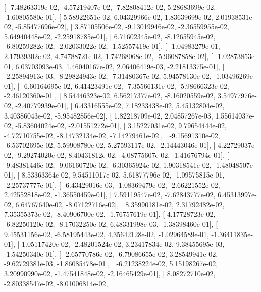 \documentclass{article}
\begin{document}
       [ -7.48263319e-02,  -4.57219407e-02,  -7.82808412e-02,
          5.28683699e-02,  -1.60805580e-01],
       [  5.58922651e-02,   6.04329966e-02,   1.83639699e-02,
          2.01938531e-02,  -5.85477696e-02],
       [  3.87105506e-02,  -9.13019946e-02,  -2.36559955e-02,
          5.64940448e-02,  -2.25918785e-01],
       [  6.71602345e-02,  -8.12655945e-02,  -6.80259282e-02,
         -2.02033022e-02,  -1.52557419e-01],
       [ -1.04983279e-01,   2.17939302e-02,   4.74788721e-02,
          1.74268068e-02,  -5.96087858e-02],
       [ -1.02873853e-01,   6.03703093e-03,   1.46040167e-02,
          2.06406419e-03,  -2.21813375e-01],
       [ -2.25894913e-03,  -8.29824943e-02,  -7.31480367e-02,
          5.94578130e-02,  -1.03496269e-01],
       [ -6.60164695e-02,   6.41423491e-02,  -7.35566131e-02,
         -5.98666323e-02,  -2.46120360e-01],
       [  8.54446323e-02,   6.56217377e-02,  -8.16020559e-02,
          3.54977976e-02,  -2.40779939e-01],
       [  6.43316555e-02,   7.18233438e-02,   5.45132804e-02,
          3.40386043e-02,  -5.95482856e-02],
       [  1.82218709e-02,   2.04857267e-03,   1.55614037e-02,
         -5.83604024e-02,  -2.01551272e-01],
       [  3.15227031e-02,   9.79654444e-02,  -4.72710755e-02,
         -8.14732134e-02,  -7.14279461e-02],
       [ -9.15691310e-02,  -6.53702695e-02,   5.59908780e-02,
          5.27593117e-02,  -2.14443046e-01],
       [  4.22729037e-02,  -9.29274020e-02,   8.40431812e-02,
         -4.08775607e-02,  -1.41676794e-01],
       [ -9.48381446e-02,  -9.06160720e-02,  -6.30365924e-02,
          1.90318541e-02,  -1.48048507e-01],
       [  8.53363364e-02,   9.54511017e-02,   5.61877796e-02,
         -1.09575815e-01,  -2.25737777e-01],
       [ -6.43429016e-03,  -1.08369479e-02,  -2.66221552e-02,
          2.42552818e-02,  -1.36550459e-01],
       [  7.59119547e-02,  -7.62843777e-02,   6.45313997e-02,
          6.64767640e-02,  -8.07122716e-02],
       [  8.35990181e-02,   2.31792482e-02,   7.35355373e-02,
         -8.40906700e-02,  -1.76757619e-01],
       [  4.17728723e-02,  -6.82250120e-02,  -8.17032250e-02,
          6.48331998e-03,  -1.38398460e-01],
       [  9.45531156e-02,  -6.58195443e-02,   4.35642128e-02,
         -1.02964589e-01,  -1.36411835e-01],
       [  1.05117420e-02,  -2.48201524e-02,   3.23417834e-02,
          9.38455695e-03,  -1.54250340e-01],
       [ -2.65770786e-02,  -6.79086655e-02,   3.28549941e-02,
         -9.62729381e-03,  -1.86085478e-01],
       [ -6.21238224e-02,   5.15198267e-02,   3.20990990e-02,
         -1.47541848e-02,  -2.16465429e-01],
       [  8.08272710e-02,  -2.80338547e-02,  -8.01006814e-02,
\end{document}

